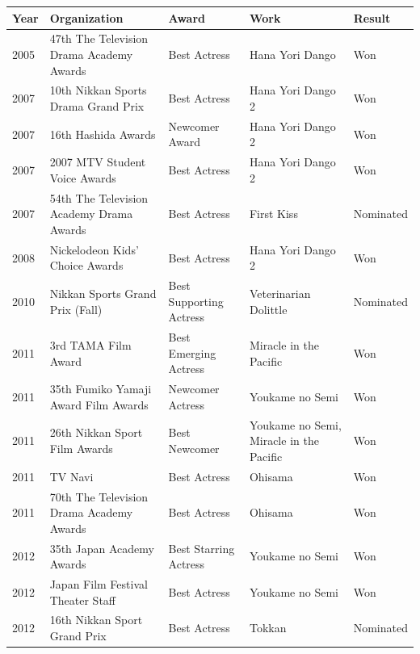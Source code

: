 \documentclass{article}
\begin{document}
\begin{tabular}{lllll}
\toprule
Year & Organization & Award & Work & Result \\
\midrule
2005 & 47th The Television Drama Academy Awards & Best Actress & Hana Yori Dango & Won \\
2007 & 10th Nikkan Sports Drama Grand Prix & Best Actress & Hana Yori Dango 2 & Won \\
2007 & 16th Hashida Awards & Newcomer Award & Hana Yori Dango 2 & Won \\
2007 & 2007 MTV Student Voice Awards & Best Actress & Hana Yori Dango 2 & Won \\
2007 & 54th The Television Academy Drama Awards & Best Actress & First Kiss & Nominated \\
2008 & Nickelodeon Kids' Choice Awards & Best Actress & Hana Yori Dango 2 & Won \\
2010 & Nikkan Sports Grand Prix (Fall) & Best Supporting Actress & Veterinarian Dolittle & Nominated \\
2011 & 3rd TAMA Film Award & Best Emerging Actress & Miracle in the Pacific & Won \\
2011 & 35th Fumiko Yamaji Award Film Awards & Newcomer Actress & Youkame no Semi & Won \\
2011 & 26th Nikkan Sport Film Awards & Best Newcomer & Youkame no Semi, Miracle in the Pacific & Won \\
2011 & TV Navi & Best Actress & Ohisama & Won \\
2011 & 70th The Television Drama Academy Awards & Best Actress & Ohisama & Won \\
2012 & 35th Japan Academy Awards & Best Starring Actress & Youkame no Semi & Won \\
2012 & Japan Film Festival Theater Staff & Best Actress & Youkame no Semi & Won \\
2012 & 16th Nikkan Sport Grand Prix & Best Actress & Tokkan & Nominated \\
\bottomrule
\end{tabular}
\end{document}
